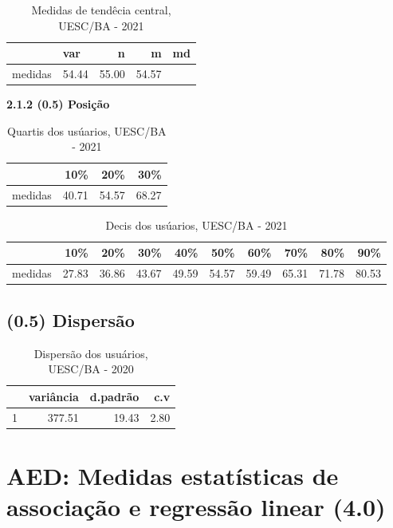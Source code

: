\documentclass[12pt]{article}\usepackage[]{graphicx}\usepackage[]{color}
\begin{document}
\begin{table}[!ht]
  \centering
  \caption{Medidas de tendêcia central, UESC/BA - 2021}
  \begin{tabular}{rlrrr}
  \toprule
 & var & n & m & md \\ 
  \midrule
 medidas & 54.44 & 55.00 & 54.57 \\ 
   \bottomrule
\end{tabular}
\end{table}

\textbf{2.1.2 (0.5) Posição}


\begin{table}[!ht]
  \centering
  \caption{Quartis dos usúarios, UESC/BA - 2021}
  \centering
  \begin{tabular}{rrrr}
  \hline
   & 10\% & 20\% & 30\% \\ 
  \hline
  medidas & 40.71 & 54.57 & 68.27 \\ 
   \hline
\end{tabular}
\end{table}

\begin{table}[!ht]
  \centering
  \caption{Decis dos usúarios, UESC/BA - 2021}
  \begin{tabular}{rrrrrrrrrr}
  \hline
 & 10\% & 20\% & 30\% & 40\% & 50\% & 60\% & 70\% & 80\% & 90\% \\ 
  \hline
medidas & 27.83 & 36.86 & 43.67 & 49.59 & 54.57 & 59.49 & 65.31 & 71.78 & 80.53 \\ 
   \hline
\end{tabular}
\end{table}

\subsection{(0.5) Dispersão}

\begin{table}[!ht]
    \centering
    \caption{Dispersão dos usuários, UESC/BA - 2020}
    \centering
  \begin{tabular}{rrrr}
    \hline
   & variância & d.padrão & c.v \\ 
    \hline
  1 & 377.51 & 19.43 & 2.80 \\
     \hline
  \end{tabular}
\end{table}
 
 \section{AED: Medidas estatísticas de associação e regressão linear (4.0)}
\end{document}

